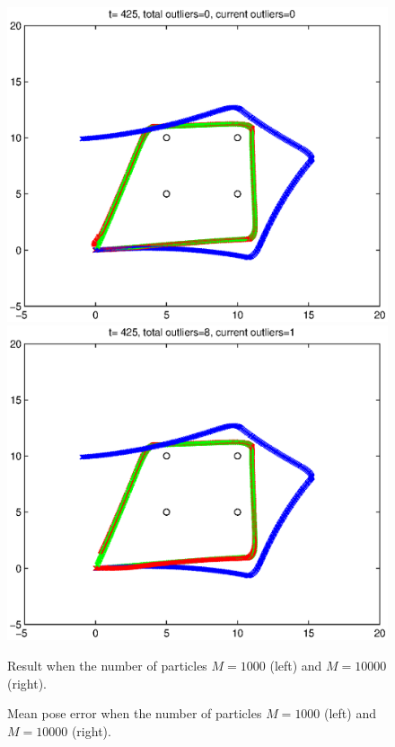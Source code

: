 \documentclass[11pt,a4paper]{article}
\begin{document}
\begin{figure}[]
	\centering
	\includegraphics[scale=0.5]{Tracking_Trajectory_Map_2_M_1000.eps}
	\includegraphics[scale=0.5]{Tracking_Trajectory_Map_2_M_10000.eps}
	\caption{Result when the number of particles $M=1000$ (left) and $M=10000$ (right).}
	\label{fig:Tracking_Map_2_M_1000_10000}
\end{figure}

\begin{figure}
	\centering
	\scalebox{0.5}{}
	\scalebox{0.5}{}
	\caption{Mean pose error when the number of particles $M=1000$ (left) and $M=10000$ (right).}
	\label{fig:Tracking_Error_Map_2_M_1000_10000}
\end{figure}
\end{document}
